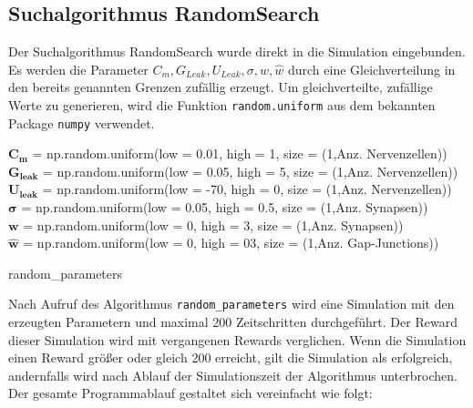 	\subsection{Suchalgorithmus RandomSearch}
		Der Suchalgorithmus RandomSearch wurde direkt in die Simulation eingebunden. Es werden die Parameter $C_m, G_{Leak}, U_{Leak}, \sigma, w, \hat{w}$ durch eine Gleichverteilung in den bereits genannten Grenzen zufällig erzeugt. Um gleichverteilte, zufällige Werte zu generieren, wird die Funktion \texttt{random.uniform} aus dem bekannten Package \texttt{numpy} verwendet.
		\begin{algorithm}
			
				$\boldsymbol{C_m}$ = np.random.uniform(low = 0.01, high = 1, size = (1,Anz. Nervenzellen))\\
				$\boldsymbol{G_{leak}}$ = np.random.uniform(low = 0.05, high = 5, size = (1,Anz. Nervenzellen))\\
				$\boldsymbol{U_{leak}}$ = np.random.uniform(low = -70, high = 0, size = (1,Anz. Nervenzellen))\\
				$\boldsymbol{\sigma}$ = np.random.uniform(low = 0.05, high = 0.5, size = (1,Anz. Synapsen))\\
				$\boldsymbol{w}$ = np.random.uniform(low = 0, high = 3, size = (1,Anz. Synapsen))\\
				$\boldsymbol{\hat{w}}$ = np.random.uniform(low = 0, high = 03, size = (1,Anz. Gap-Junctions))
			\caption{random\_parameters}
		\end{algorithm}
		Nach Aufruf des Algorithmus \texttt{random\_parameters} wird eine Simulation mit den erzeugten Parametern und maximal 200 Zeitschritten durchgeführt. Der Reward dieser Simulation wird mit vergangenen Rewards verglichen. Wenn die Simulation einen Reward größer oder gleich 200 erreicht, gilt die Simulation als erfolgreich, andernfalls wird nach Ablauf der Simulationszeit der Algorithmus unterbrochen.\\
		Der gesamte Programmablauf gestaltet sich vereinfacht wie folgt:
